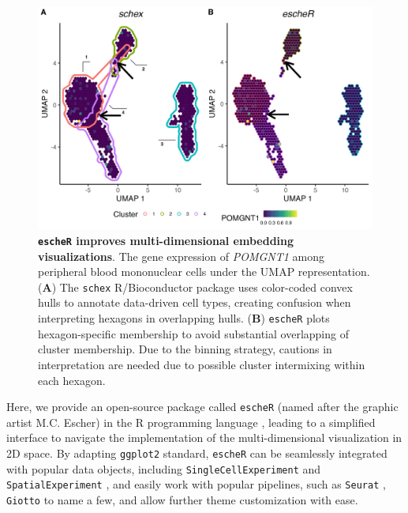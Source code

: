 \documentclass[10pt,twocolumn]{article}
\begin{document}
\begin{figure}[t]
\begin{center}
\includegraphics[width=\textwidth]{Manuscript/figure/embedding.jpg}
\caption{\small \textbf{\texttt{escheR} improves multi-dimensional embedding visualizations}. The gene expression of \textit{POMGNT1} among peripheral blood mononuclear cells \cite{PBMC} under the UMAP representation. (\textbf{A}) The \texttt{schex} R/Bioconductor package uses color-coded convex hulls to annotate data-driven cell types, creating confusion when interpreting hexagons in overlapping hulls. (\textbf{B}) \texttt{escheR} plots hexagon-specific membership to avoid substantial overlapping of cluster membership. Due to the binning strategy, cautions in interpretation are needed due to possible cluster intermixing within each hexagon.} 
\label{fig:embedding} 
\end{center}
\vspace{-0.3in}
\end{figure}

Here, we provide an open-source package called \texttt{escheR} (named after the graphic artist M.C. Escher) in the R programming language \cite{R}, leading to a simplified interface to navigate the implementation of the multi-dimensional visualization in 2D space. By adapting \texttt{ggplot2} standard, \texttt{escheR} can be seamlessly integrated with popular data objects, including \texttt{SingleCellExperiment} \cite{amezquita2020} and \texttt{SpatialExperiment} \cite{righelli2022}, and easily work with popular pipelines, such as \texttt{Seurat} \cite{hao_2021}, \texttt{Giotto} \cite{dries_2021} to name a few, and allow further theme customization with ease.
\end{document}
